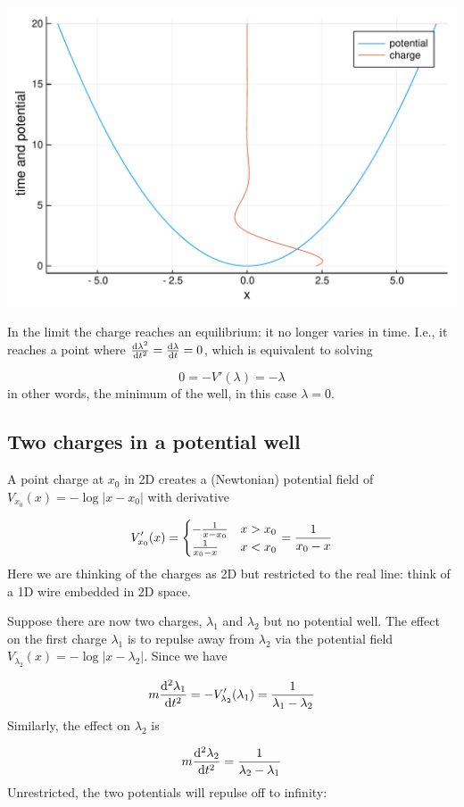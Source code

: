 \documentclass[12pt,a4paper]{article}
\def\D{ {\rm d} }
\def\dt{\D t}
\begin{document}
\includegraphics[width=\linewidth]{figures/Lecture16_1_1.pdf}

In the limit the charge reaches an equilibrium: it no longer varies in time. I.e.,  it reaches a point where ${ \D \lambda^2 \over \dt^2} = { \D \lambda \over \dt}  = 0$, which is equivalent to solving

\[
 0 = - V'(\lambda)  = - \lambda
\]
in other words, the minimum of the well, in this case $\lambda = 0$.

\subsection{Two charges in a potential well}
A point charge at $x_0$ in 2D creates a (Newtonian) potential field of $V_{x_0}(x) = -\log|x - x_0|$ with derivative

\[
V_{x_0}'(x) = \begin{cases} -{1 \over x - x_0} & x > x_0 \\
        {1 \over x_0 - x} & x < x_0 
\end{cases} = {1 \over x_0 - x}
\]
Here we are thinking of the charges as 2D but restricted to the real line: think of a 1D wire embedded in 2D space. 

Suppose there are now two charges, $\lambda_1$ and $\lambda_2$ but no potential well.  The effect on the first charge $\lambda_1$ is  to repulse away from $\lambda_2$ via the potential field $V_{\lambda_2}(x) = -\log|x - \lambda_2|$. Since we have

\[
m {\D^2 \lambda_1 \over \D t^2} = - V_{\lambda_2}'(\lambda_1) =  {1 \over \lambda_1 -\lambda_2}
\]
Similarly, the effect on $\lambda_2$ is

\[
m {\D^2 \lambda_2 \over \D t^2} = {1 \over \lambda_2 -\lambda_1}
\]
Unrestricted, the two potentials will repulse off to infinity:
\end{document}
